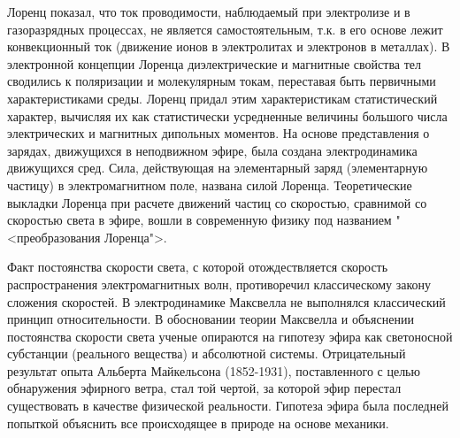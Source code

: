\documentclass[exam_answers.tex]{subfiles}
\begin{document}
Лоренц показал, что ток проводимости, наблюдаемый при электролизе и в
газоразрядных процессах, не является самостоятельным, т.к. в его основе лежит
конвекционный ток (движение ионов в электролитах и электронов в металлах).
В электронной концепции Лоренца диэлектрические и магнитные свойства тел
сводились к поляризации и молекулярным токам, переставая быть первичными
характеристиками среды. Лоренц придал этим характеристикам статистический
характер, вычисляя их как статистически усредненные величины большого
числа электрических и магнитных дипольных моментов. На основе
представления о зарядах, движущихся в неподвижном эфире, была создана
электродинамика движущихся сред. Сила, действующая на элементарный заряд
(элементарную частицу) в электромагнитном поле, названа силой Лоренца.
Теоретические выкладки Лоренца при расчете движений частиц со скоростью,
сравнимой со скоростью света в эфире, вошли в современную физику под
названием "<преобразования Лоренца">.

Факт постоянства скорости света, с которой отождествляется скорость
распространения электромагнитных волн, противоречил классическому закону
сложения скоростей. В электродинамике Максвелла не выполнялся
классический принцип относительности. В обосновании теории Максвелла и
объяснении постоянства скорости света ученые опираются на гипотезу эфира
как светоносной субстанции (реального вещества) и абсолютной системы.
Отрицательный результат опыта Альберта Майкельсона (1852-1931),
поставленного с целью обнаружения эфирного ветра, стал той чертой, за
которой эфир перестал существовать в качестве физической реальности.
Гипотеза эфира была последней попыткой объяснить все происходящее в
природе на основе механики. 
\end{document}
